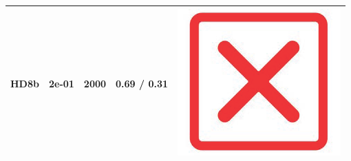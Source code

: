 \begin{table}[!h]
{\begin{tabular}[t]{ccccc}
\midrule
\addlinespace
HD8b & 2e-01 & 2000 & 0.69 / 0.31 & \includegraphics[scale=0.05]{figures/red_cross.png}\\
\midrule
\bottomrule
\end{tabular}}
\end{table}

\newpage

